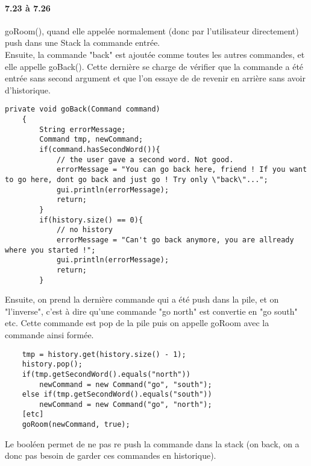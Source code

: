 \documentclass[11pt,a4paper]{report}
\begin{document}
\paragraph{7.23 à  7.26}
goRoom(), quand elle appelée normalement (donc par l'utilisateur directement) push dans une Stack la commande entrée.\\
Ensuite, la commande "back" est ajoutée comme toutes les autres commandes, et elle appelle goBack(). Cette dernière se charge de vérifier que la commande a été entrée sans second argument et que l'on essaye de de revenir en arrière sans avoir d'historique.
\begin{lstlisting}
private void goBack(Command command)
    {
        String errorMessage;
        Command tmp, newCommand;
        if(command.hasSecondWord()){
            // the user gave a second word. Not good.
            errorMessage = "You can go back here, friend ! If you want to go here, dont go back and just go ! Try only \"back\"...";
            gui.println(errorMessage);
            return;
        }
        if(history.size() == 0){
            // no history
            errorMessage = "Can't go back anymore, you are allready where you started !";
            gui.println(errorMessage);
            return;
        }
\end{lstlisting}
Ensuite, on prend la dernière commande qui a été push dans la pile, et on "l'inverse", c'est à dire qu'une commande "go north" est convertie en "go south" etc. Cette commande est pop de la pile puis on appelle goRoom avec la commande ainsi formée.
\begin{lstlisting}
    tmp = history.get(history.size() - 1);
    history.pop();
    if(tmp.getSecondWord().equals("north"))
        newCommand = new Command("go", "south");
    else if(tmp.getSecondWord().equals("south"))
        newCommand = new Command("go", "north");
    [etc]
    goRoom(newCommand, true);
\end{lstlisting}
Le booléen permet de ne pas re push la commande dans la stack (on back, on a donc pas besoin de garder ces commandes en historique).
\end{document}
